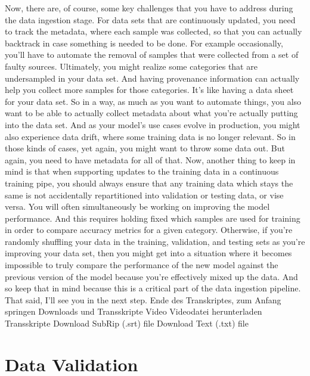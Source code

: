 {{{{    Now, there are, of course, some key challenges
    that you have to address during the data ingestion stage.
    For data sets that are continuously updated, you
    need to track the metadata, where each sample was collected,
    so that you can actually backtrack in case something is needed to be done.
    For example occasionally, you'll have to automate
    the removal of samples that were collected from a set of faulty sources.
    Ultimately, you might realize some categories
    that are undersampled in your data set.
    And having provenance information can actually
    help you collect more samples for those categories.
    It's like having a data sheet for your data set.
    So in a way, as much as you want to automate things,
    you also want to be able to actually collect metadata about what you're
    actually putting into the data set.
    And as your model's use cases evolve in production,
    you might also experience data drift, where some training
    data is no longer relevant.
    So in those kinds of cases, yet again, you might want to throw some data out.
    But again, you need to have metadata for all of that.
    Now, another thing to keep in mind is that when supporting updates
    to the training data in a continuous training pipe,
    you should always ensure that any training data which stays the same
    is not accidentally repartitioned into validation or testing data,
    or vise versa.
    You will often simultaneously be working on improving the model performance.
    And this requires holding fixed which samples
    are used for training in order to compare accuracy metrics for a given
    category.
    Otherwise, if you're randomly shuffling your data in the training, validation,
    and testing sets as you're improving your data set,
    then you might get into a situation where
    it becomes impossible to truly compare the performance of the new model
    against the previous version of the model
    because you're effectively mixed up the data.
    And so keep that in mind because this is a critical part of the data ingestion
    pipeline.
    That said, I'll see you in the next step.
    Ende des Transkriptes, zum Anfang springen
    Downloads und Transskripte
    Video
    Videodatei herunterladen
    Transskripte
    Download SubRip (.srt) file
    Download Text (.txt) file        
        
\section{Data Validation}

}}}}
